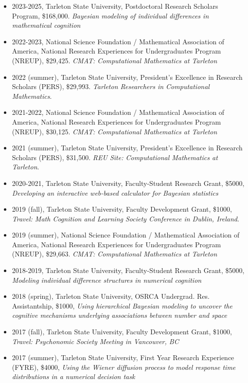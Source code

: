 \documentclass[article,10pt]{article}
\begin{document}
\begin{itemize}
\item 2023-2025, Tarleton State University, Postdoctoral Research Scholars Program, \$168,000. \emph{Bayesian modeling of individual differences in mathematical cognition}
\item 2022-2023, National Science Foundation / Mathematical Association of America, National Research Experiences for Undergraduates Program (NREUP), \$29,425. \emph{CMAT: Computational Mathematics at Tarleton}
\item 2022 (summer), Tarleton State University, President's Excellence in Research Scholars (PERS), \$29,993. \emph{Tarleton Researchers in Computational Mathematics}.
\item 2021-2022, National Science Foundation / Mathematical Association of America, National Research Experiences for Undergraduates Program (NREUP), \$30,125. \emph{CMAT: Computational Mathematics at Tarleton}
\item 2021 (summer), Tarleton State University, President's Excellence in Research Scholars (PERS), \$31,500. \emph{REU Site: Computational Mathematics at Tarleton}.
\item 2020-2021, Tarleton State University, Faculty-Student Research Grant, \$5000, \emph{Developing an interactive web-based calculator for Bayesian statistics}
\item 2019 (fall), Tarleton State University, Faculty Development Grant, \$1000, \emph{Travel: Math Cognition and Learning Society Conference in Dublin, Ireland}.
\item 2019 (summer), National Science Foundation / Mathematical Association of America, National Research Experiences for Undergraduates Program (NREUP), \$29,663. \emph{CMAT: Computational Mathematics at Tarleton}
\item 2018-2019, Tarleton State University, Faculty-Student Research Grant, \$5000, \emph{Modeling individual difference structures in numerical cognition}
\item 2018 (spring), Tarleton State University, OSRCA Undergrad. Res. Assistantship, \$1000, \emph{Using hierarchical Bayesian modeling to uncover the cognitive mechanisms underlying associations between number and space}
\item 2017 (fall), Tarleton State University, Faculty Development Grant, \$1000, \emph{Travel: Psychonomic Society Meeting in Vancouver, BC}
\item 2017 (summer), Tarleton State University, First Year Research Experience (FYRE), \$4000, \emph{Using the Wiener diffusion process to model response time distributions in a numerical decision task}

\end{itemize}
\end{document}
